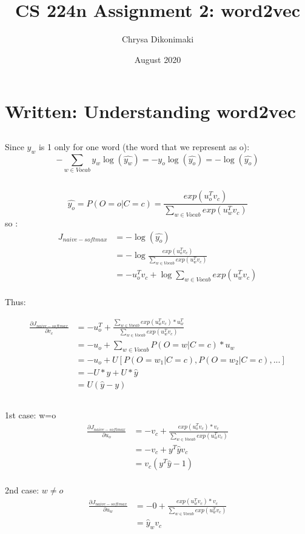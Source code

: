 \documentclass{article}
\title{CS 224n Assignment 2: word2vec}
\author{Chrysa Dikonimaki}
\date{August 2020}
\begin{document}
\maketitle

\section{Written: Understanding word2vec}
\subsection{}
Since $y_w$ is 1 only for one word (the word that we represent as o): 
\[ -\sum_{w\in{Vocab}} y_w \log (\hat{y_w}) = - y_o \log (\hat{y_o}) = -\log{(\hat{y_o})}\] 

\subsection{}
\[ \hat{y_o} = P(O=o|C=c) = \frac{exp(u_o^T v_c)}{\sum_{w\in{Vocab}}exp(u_w^T v_c)}\]
so : \\
\begin{align*}
J_{naive-softmax} &=  -\log{(\hat{y_o})} \\ 
                 &=  - \log{ \frac{exp(u_o^T v_c)}{\sum_{w\in{Vocab}}exp(u_w^T v_c)}} \\
                 &= - u_o^T v_c + \log{\sum_{w\in{Vocab}}exp(u_w^T v_c)} \\  
\end{align*}

Thus:

\begin{align*}
 \frac{\partial J_{naive-softmax}}{\partial v_c} &= - u_o^T + \frac{ \sum_{w\in{Vocab}}exp(u_w^T v_c)*u_w^T}{\sum_{w\in{Vocab}} exp(u_w^T v_c)} \\
 &= - u_o + \sum_{w\in{Vocab}} P(O=w|C=c)*u_w \\
 &= - u_o + U [P(O=w_1|C=c), P(O=w_2|C=c),...] \\
 &= - U*y + U*\hat{y} \\
 &= U ( \hat{y} - y )
\end{align*}

\subsection{}
1st case: w=o
\begin{align*}
 \frac{\partial J_{naive-softmax}}{\partial u_o} &=
 - v_c + \frac{ exp(u_o^T v_c)*v_c}{\sum_{w\in{Vocab}} exp(u_w^T v_c)} \\
&= - v_c + y^T \hat{y} v_c \\
&= v_c (y^T \hat{y} -1)
\end{align*}
\\
2nd case: $w \neq o$
\begin{align*}
 \frac{\partial J_{naive-softmax}}{\partial u_w} &= - 0 + \frac{ exp(u_w^T v_c)*v_c}{\sum_{w\in{Vocab}} exp(u_w^T v_c)} \\
 &=\hat{y}_{w}v_{c}
\end{align*}
\end{document}
